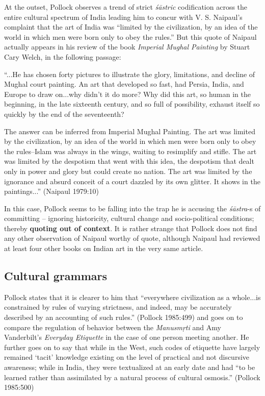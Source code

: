 At the outset, Pollock observes a trend of strict {\sl śāstric} codiﬁcation across the entire cultural spectrum of India leading him to concur with V. S. Naipaul's complaint that the art of India was ``limited by the civilization, by an idea of the world in which men were born only to obey the rules.'' But this quote of Naipaul actually appears in his review of the book {\sl Imperial Mughal Painting} by Stuart Cary Welch, in the following passage:
\begin{myquote}
``...He has chosen forty pictures to illustrate the glory, limitations, and decline of Mughal court painting. An art that developed so fast, had Persia, India, and Europe to draw on...why didn't it do more? Why did this art, so human in the beginning, in the late sixteenth century, and so full of possibility, exhaust itself so quickly by the end of the seventeenth?

The answer can be inferred from Imperial Mughal Painting. The art was limited by the civilization, by an idea of the world in which men were born only to obey the rules--Islam was always in the wings, waiting to resimplify and stiﬂe. The art was limited by the despotism that went with this idea, the despotism that dealt only in power and glory but could create no nation. The art was limited by the ignorance and absurd conceit of a court dazzled by its own glitter. It shows in the paintings...'' (Naipaul 1979:10)
\end{myquote}

In this case, Pollock seems to be falling into the trap he is accusing the {\sl śāstra}-s of committing -- ignoring historicity, cultural change and socio-political conditions; thereby {\bf quoting out of context}. It is rather strange that Pollock does not ﬁnd any other observation of Naipaul worthy of quote, although Naipaul had reviewed at least four other books on Indian art in the very same article.

\subsection{Cultural grammars}\label{art12-sec3.3}

Pollock states that it is clearer to him that ``everywhere civilization as a whole...is constrained by rules of varying strictness, and indeed, may be accurately described by an accounting of such rules.'' (Pollock 1985:499) and goes on to compare the regulation of behavior between the {\sl Manusmṛti} and Amy Vanderbilt's {\sl Everyday Etiquette} in the case of one person meeting another. He further goes on to say that while in the West, such codes of etiquette have largely remained `tacit' knowledge existing on the level of practical and not discursive awareness; while in India, they were textualized at an early date and had ``to be learned rather than assimilated by a natural process of cultural osmosis.'' (Pollock 1985:500) 

